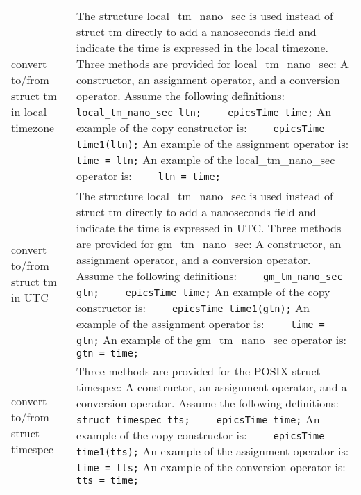 \begin{center}
\begin{longtable}{p{2in}p{4.75in}}
convert to/from struct tm in local timezone &
The structure local\_tm\_nano\_sec is used instead of struct tm directly to add a nanoseconds field and indicate the time is expressed in the local timezone.
Three methods are provided for local\_tm\_nano\_sec:
A constructor, an assignment operator, and a conversion operator.
Assume the following definitions:\newline
\verb|    local_tm_nano_sec ltn;| \newline
\verb|    epicsTime time;| \newline
An example of the copy constructor is: \newline
\verb|    epicsTime time1(ltn);| \newline
An example of the assignment operator is: \newline
\verb|    time = ltn;| \newline
An example of the local\_tm\_nano\_sec operator is: \newline
\verb|    ltn = time;| \\

convert to/from struct tm in UTC &
The structure local\_tm\_nano\_sec is used instead of struct tm directly to add a nanoseconds field and indicate the time is expressed in UTC.
Three methods are provided for gm\_tm\_nano\_sec:
A constructor, an assignment operator, and a conversion operator.
Assume the following definitions:\newline
\verb|    gm_tm_nano_sec gtn;| \newline
\verb|    epicsTime time;| \newline
An example of the copy constructor is: \newline
\verb|    epicsTime time1(gtn);| \newline
An example of the assignment operator is: \newline
\verb|    time = gtn;| \newline
An example of the gm\_tm\_nano\_sec operator is: \newline
\verb|    gtn = time;| \\

convert to/from struct timespec &
Three methods are provided for the POSIX struct timespec:
A constructor, an assignment operator, and a conversion operator.
Assume the following definitions:\newline
\verb|    struct timespec tts;| \newline
\verb|    epicsTime time;| \newline
An example of the copy constructor is: \newline
\verb|    epicsTime time1(tts);| \newline
An example of the assignment operator is: \newline
\verb|    time = tts;| \newline
An example of the conversion operator is: \newline
\verb|    tts = time;| \\


\end{longtable}
\end{center}
